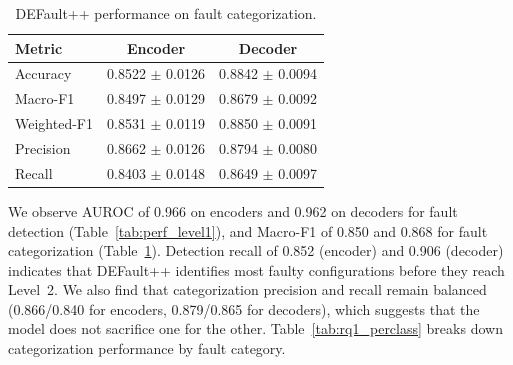 \begin{table}[!htbp]
\centering
\caption{DEFault++ performance on fault categorization.}
\label{tab:perf_level2_overall}
\begin{tabular}{l c c}
\toprule
\textbf{Metric} & \textbf{Encoder} & \textbf{Decoder} \\
\midrule
Accuracy & 0.8522 $\pm$ 0.0126 & 0.8842 $\pm$ 0.0094 \\
Macro-F1 & 0.8497 $\pm$ 0.0129 & 0.8679 $\pm$ 0.0092 \\
Weighted-F1 & 0.8531 $\pm$ 0.0119 & 0.8850 $\pm$ 0.0091 \\
Precision & 0.8662 $\pm$ 0.0126 & 0.8794 $\pm$ 0.0080 \\
Recall & 0.8403 $\pm$ 0.0148 & 0.8649 $\pm$ 0.0097 \\
\bottomrule
\end{tabular}
\end{table}

We observe AUROC of 0.966 on encoders and 0.962 on decoders for fault detection (Table~\ref{tab:perf_level1}), and Macro-F1 of 0.850 and 0.868 for fault categorization (Table~\ref{tab:perf_level2_overall}). Detection recall of 0.852 (encoder) and 0.906 (decoder) indicates that DEFault++ identifies most faulty configurations before they reach Level~2. We also find that categorization precision and recall remain balanced (0.866/0.840 for encoders, 0.879/0.865 for decoders), which suggests that the model does not sacrifice one for the other. Table~\ref{tab:rq1_perclass} breaks down categorization performance by fault category.

